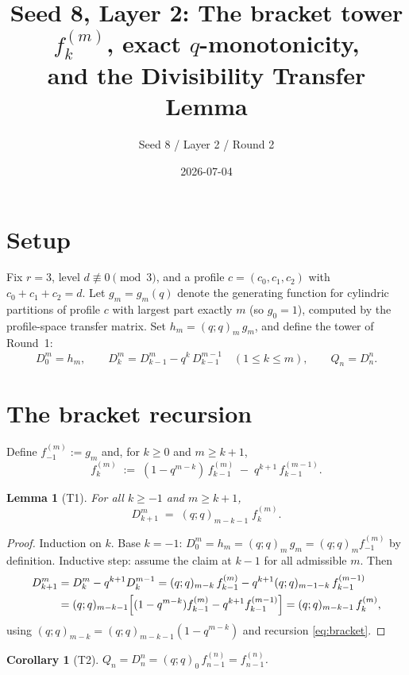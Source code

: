 \documentclass[11pt]{article}
\title{Seed 8, Layer 2: The bracket tower $f_k^{(m)}$, exact $q$-monotonicity,\\ and the Divisibility Transfer Lemma}
\author{Seed 8 / Layer 2 / Round 2}
\date{2026-07-04}
\newtheorem{lemma}{Lemma}
\newtheorem{corollary}{Corollary}
\begin{document}
\maketitle

\section{Setup}

Fix $r=3$, level $d\not\equiv 0\pmod 3$, and a profile $c=(c_0,c_1,c_2)$ with
$c_0+c_1+c_2=d$. Let $g_m=g_m(q)$ denote the generating function for cylindric
partitions of profile $c$ with largest part exactly $m$ (so $g_0=1$), computed
by the profile-space transfer matrix. Set $h_m=(q;q)_m\,g_m$, and define the
tower of Round~1:
\[
D_0^m=h_m,\qquad D_k^m=D_{k-1}^m-q^k\,D_{k-1}^{m-1}\quad(1\le k\le m),\qquad
Q_n=D_n^n .
\]

\section{The bracket recursion}

Define $f_{-1}^{(m)}:=g_m$ and, for $k\ge 0$ and $m\ge k+1$,
\begin{equation}\label{eq:bracket}
f_k^{(m)} \;:=\; (1-q^{m-k})\,f_{k-1}^{(m)} \;-\; q^{k+1}\,f_{k-1}^{(m-1)} .
\end{equation}

\begin{lemma}[T1]\label{lem:T1}
For all $k\ge -1$ and $m\ge k+1$,
\[
D_{k+1}^{m} \;=\; (q;q)_{m-k-1}\; f_k^{(m)} .
\]
\end{lemma}

\begin{proof}
Induction on $k$. Base $k=-1$: $D_0^m=h_m=(q;q)_m\,g_m=(q;q)_m f_{-1}^{(m)}$
by definition. Inductive step: assume the claim at $k-1$ for all admissible
$m$. Then
\begin{align*}
D_{k+1}^m &= D_k^m - q^{k+1} D_k^{m-1}
   = (q;q)_{m-k}\,f_{k-1}^{(m)} - q^{k+1}(q;q)_{m-1-k}\,f_{k-1}^{(m-1)}\\
 &= (q;q)_{m-k-1}\Bigl[(1-q^{m-k})f_{k-1}^{(m)} - q^{k+1} f_{k-1}^{(m-1)}\Bigr]
   = (q;q)_{m-k-1}\, f_k^{(m)},
\end{align*}
using $(q;q)_{m-k}=(q;q)_{m-k-1}(1-q^{m-k})$ and recursion \eqref{eq:bracket}.
\end{proof}

\begin{corollary}[T2]
$Q_n = D_n^n = (q;q)_0\, f_{n-1}^{(n)} = f_{n-1}^{(n)}$.
\end{corollary}
\end{document}
